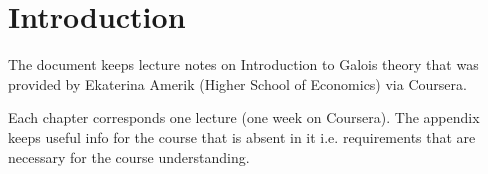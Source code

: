 \chapter*{Introduction}

The document keeps lecture notes on Introduction to Galois theory that
was provided by Ekaterina Amerik (Higher School of Economics) via
Coursera.

Each chapter corresponds one lecture (one week on Coursera). The
appendix keeps useful info for the course that is absent in it
i.e. requirements that are necessary for the course understanding.
